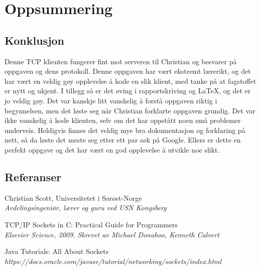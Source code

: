 \section{Oppsummering}
\subsection{Konklusjon}
Denne TCP klienten fungerer fint mot serveren til Christian og besvarer på oppgaven og dens protokoll. Denne oppgaven har vært ekstremt lærerikt, og det har vært en veldig gøy opplevelse å kode en slik klient, med tanke på at fagstoffet er nytt og ukjent. I tillegg så er det øving i rapportskriving og LaTeX, og det er jo veldig gøy. Det var kanskje litt vanskelig å forstå oppgaven riktig i begynnelsen, men det løste seg når Christian forklarte oppgaven grundig. Det var ikke vanskelig å kode klienten, selv om det har oppstått noen små problemer underveis. Heldigvis finnes det veldig mye bra dokumentasjon og forklaring på nett, så da løste det meste seg etter ett par søk på Google. Ellers er dette en perfekt oppgave og det har vært en god opplevelse å utvikle noe slikt.

\subsection{Referanser}
\renewcommand{\section}[2]{}
\begin{thebibliography}{50}
		Christian Scott, Universitetet i Sørøst-Norge\\
		\textit{Avdelingsingeniør, lærer og guru ved USN Kongsberg}

		TCP/IP Sockets in C: Practical Guide for Programmers\\
		\textit{Elsevier Science, 2009. Skrevet av Michael Donahoo, Kenneth Calvert}

		Java Tutorials: All About Sockets
		\\\textit{https://docs.oracle.com/javase/tutorial/networking/sockets/index.html}
\end{thebibliography}

\newpage
